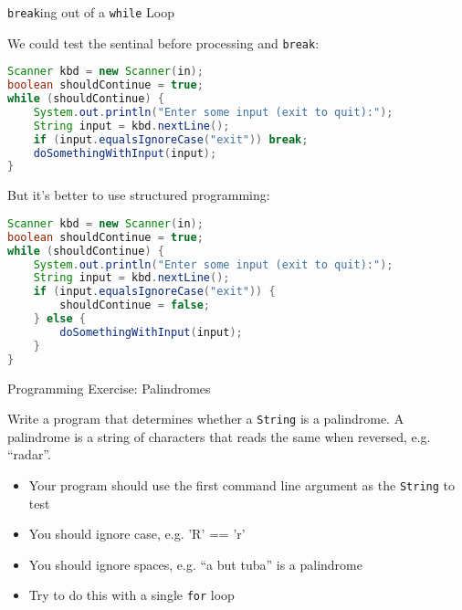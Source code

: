 \documentclass{beamer}
\begin{document}
\begin{frame}[fragile]{{\tt break}ing out of a {\tt while} Loop}

\vspace{-.05in}
We could test the sentinal before processing and {\tt break}:
\vspace{-.05in}
\begin{lstlisting}[language=Java]
Scanner kbd = new Scanner(in);
boolean shouldContinue = true;
while (shouldContinue) {
    System.out.println("Enter some input (exit to quit):");
    String input = kbd.nextLine();
    if (input.equalsIgnoreCase("exit")) break;
    doSomethingWithInput(input);
}
\end{lstlisting}
\vspace{-.1in}
But it's better to use structured programming:
\vspace{-.05in}
\begin{lstlisting}[language=Java]
Scanner kbd = new Scanner(in);
boolean shouldContinue = true;
while (shouldContinue) {
    System.out.println("Enter some input (exit to quit):");
    String input = kbd.nextLine();
    if (input.equalsIgnoreCase("exit")) {
        shouldContinue = false;
    } else {
        doSomethingWithInput(input);
    }
}
\end{lstlisting}


\end{frame}


\begin{frame}[fragile]{Programming Exercise: Palindromes}

Write a program that determines whether a {\tt String} is a palindrome.  A palindrome is a string of characters that reads the same when reversed, e.g. ``radar''.
\begin{itemize}
\item Your program should use the first command line argument as the {\tt String} to test
\item You should ignore case, e.g. 'R' == 'r'
\item You should ignore spaces, e.g. ``a but tuba'' is a palindrome
\item Try to do this with a single {\tt for} loop
\end{itemize}


\end{frame}
\end{document}
